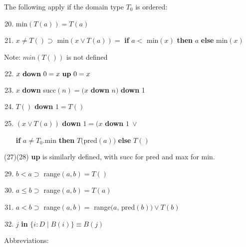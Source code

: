 The following apply if the domain type $T_0$ is ordered:

\begin{enumerate}[leftmargin=2\parindent, label=(\arabic*)]
	\setcounter{enumi}{19}	
	\item min$(T(a)) = T(a)$
	\item $x \neq T() \supset$ min$(x \lor T(a)) =$ \textbf{if} $a <$ min$(x)$ \textbf{then} $a$ \textbf{else} min$(x)$
\end{enumerate}

\noindent
Note: $min(T())$ is not defined

\begin{enumerate}[leftmargin=2\parindent, label=(\arabic*)]
	\setcounter{enumi}{21}
	\item $x \text{ \textbf{down} } 0 = x \text{ \textbf{up} } 0 = x$
	\item $x$ \textbf{down} succ$(n) = (x$ \textbf{down} $n)$ \textbf{down} 1
	\item $T()$ \textbf{down} $1 = T()$
	\item $(x \lor T(a))$ \textbf{down} $1 = (x$ \textbf{down} $1\ \lor$
	
	\quad \textbf{if} $a \neq T_0$.min \textbf{then} $T($pred$(a))$ \textbf{else} $T()$
\end{enumerate}

\tabto*{0.9em}(27)\textendash{}(28) \textbf{up} is similarly defined, with succ for pred and max for min.

\begin{enumerate}[leftmargin=2\parindent, label=(\arabic*)]	
	\setcounter{enumi}{28}
	\item $b < a \supset$ range$(a, b) = T()$
	\item $a \leqslant b \supset$ range$(a, b) = T(a)$
	\item $a < b \supset$ range$(a, b) =$ range$(a$, pred$(b)) \lor T(b)$
	\item $j$ \textbf{in} $\{i:D \mid B(i)\} \equiv B(j)$
\end{enumerate}

\noindent
Abbreviations:

